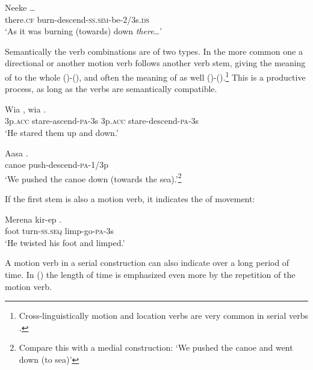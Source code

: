 \ea%
\label{ex:x379}
\gll Neeke  {\dots} \\
there.\textsc{cf} burn-descend-\textsc{ss}.\textsc{sim}-be-2/3s.\textsc{ds}\\
\glt`As it was burning (towards) down \textit{there}{\dots}'
\z

Semantically the verb combinations are of two types. In the more common one a directional or another motion verb follows another verb stem, giving the meaning of  to the whole ()-(), and often the meaning of  as well ()-().\footnote{Cross-linguistically motion and location verbs are very common in serial verbs \citep[9]{Lord1993}.} This is a productive process, as long as the verbs are semantically compatible.

\ea%
\label{ex:x438}
\gll Wia , wia . \\
3p.\textsc{acc} stare-ascend-\textsc{pa}-3s 3p.\textsc{acc} stare-descend-\textsc{pa}-3s\\
\glt`He stared them up and down.'
\z

\ea%
\label{ex:x381}
\gll Aasa . \\
canoe push-descend-\textsc{pa}-1/3p \\
\glt`We pushed the canoe down (towards the sea).'\footnote{Compare this with a medial construction:  `We pushed the canoe and went down (to sea)'}
\z

If the first stem is also a motion verb, it indicates the  of movement:

\ea%
\label{ex:x380}
\gll Merena kir-ep . \\
foot turn-\textsc{ss}.\textsc{seq} limp-go-\textsc{pa}-3s \\
\glt`He twisted his foot and limped.'
\z

A motion verb in a serial construction can also indicate  over a long period of time. In () the length of time is emphasized even more by the repetition of the motion verb.

